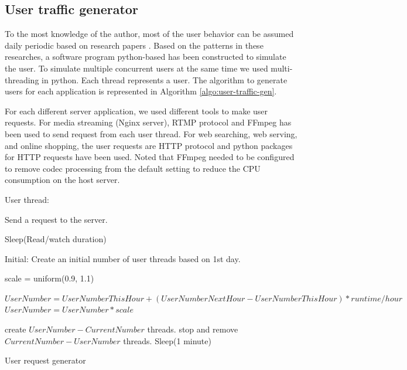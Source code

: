\documentclass[conference]{IEEEtran}
\makeatletter
\newcommand{\removelatexerror}{\let\@latex@error\@gobble}
\makeatother
\begin{document}
\subsection{User traffic generator}
To the most knowledge of the author, most of the user behavior can be assumed daily periodic based on research papers \cite{Kooti2016,Ullah2012,Taghavi2012,Yu2006}. Based on the patterns in these researches, a software program python-based has been constructed to simulate the user. To simulate multiple concurrent users at the same time we used multi-threading in python. Each thread represents a user. The algorithm to generate users for each application is represented in Algorithm \ref{algo:user-traffic-gen}. 

For each different server application, we used different tools to make user requests. For media streaming (Nginx server), RTMP protocol and FFmpeg has been used to send request from each user thread. For web searching, web serving, and online shopping, the user requests are HTTP protocol and python packages for HTTP requests have been used. Noted that FFmpeg needed to be configured to remove codec processing from the default setting to reduce the CPU consumption on the host server.

\removelatexerror
\begin{algorithm}[]
    \DontPrintSemicolon
        
        User thread:
        {
            Send a request to the server.

            Sleep(Read/watch duration)
        }

        Initial: Create an initial number of user threads based on 1st day.

        {
            scale = uniform(0.9, 1.1)
            {
                {
                    $UserNumber = UserNumberThisHour + (UserNumberNext Hour - UserNumberThisHour)*runtime/hour$
                    $UserNumber = UserNumber*scale$

                    {
                        create $UserNumber - CurrentNumber$ threads.
                    }
                    \Else
                    {
                        stop and remove $CurrentNumber - UserNumber$ threads.
                    }
                    Sleep(1 minute)
                }
            }
        }
    \caption{User request generator}
    \label{algo:user-traffic-gen}
\end{algorithm}
\end{document}

